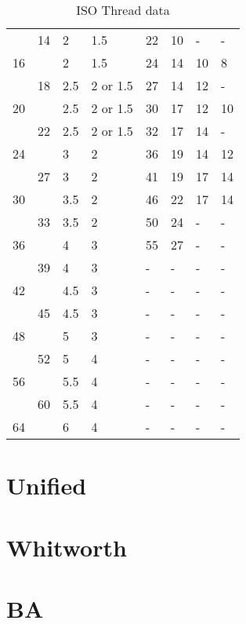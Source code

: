 \begin{table}[h]
\begin{longtable}{ll|ll|llll}
        &14  &2    &1.5        &22  &10     &-      &-    \\
    16  &    &2    &1.5        &24  &14     &10     &8 \\
        &18  &2.5  &2 or 1.5   &27  &14     &12     &-    \\
    20  &    &2.5  &2 or 1.5   &30  &17     &12     &10 \\
        &22  &2.5  &2 or 1.5   &32  &17     &14     &-    \\
    24  &    &3    &2          &36  &19     &14     &12 \\
        &27  &3    &2          &41  &19     &17     &14 \\
    30  &    &3.5  &2          &46  &22     &17     &14 \\
        &33  &3.5  &2          &50  &24     &-      &-    \\
    36  &    &4    &3          &55  &27     &-      &-    \\
        &39  &4    &3          &-   &-      &-      &-    \\
    42  &    &4.5  &3          &-   &-      &-      &-    \\
        &45  &4.5  &3          &-   &-      &-      &-    \\
    48  &    &5    &3          &-   &-      &-      &-    \\
        &52  &5    &4          &-   &-      &-      &-    \\
    56  &    &5.5  &4          &-   &-      &-      &-    \\
        &60  &5.5  &4          &-   &-      &-      &-    \\
    64  &    &6    &4          &-   &-      &-      &-    \\
\end{longtable}
\caption{ISO Thread data}
\end{table}
\section{Unified}
\section{Whitworth}
\section{BA}
